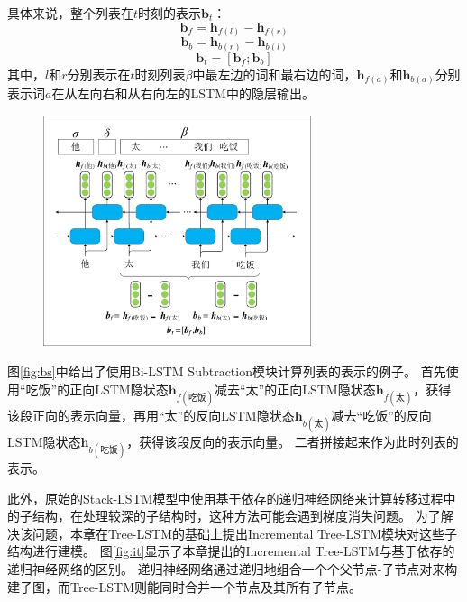 具体来说，整个列表在$t$时刻的表示$\bm{b}_t$：
\begin{equation}
	\bm{b}_f=\bm{h}_{f(l)}-\bm{h}_{f(r)}
\end{equation}
\begin{equation}
	\bm{b}_b=\bm{h}_{b(r)}-\bm{h}_{b(l)}
\end{equation}
\begin{equation}
	\bm{b}_t=[\bm{b}_f ; \bm{b}_b]
\end{equation}
其中，$l$和$r$分别表示在$t$时刻列表$\beta$中最左边的词和最右边的词，$\bm{h}_{f(a)}$和$\bm{h}_{b(a)}$分别表示词$a$在从左向右和从右向左的LSTM中的隐层输出。

\begin{figure}[hbtp]
	\centering
	\includegraphics[width=0.7\textwidth]{figures/bs.pdf}
\end{figure}

图\ref{fig:bs}中给出了使用Bi-LSTM Subtraction模块计算列表的表示的例子。
首先使用“吃饭”的正向LSTM隐状态$\bm{h}_{f(\text{吃饭})}$减去“太”的正向LSTM隐状态$\bm{h}_{f(\text{太})}$，获得该段正向的表示向量，再用“太”的反向LSTM隐状态$\bm{h}_{b(\text{太})}$减去“吃饭”的反向LSTM隐状态$\bm{h}_{b(\text{吃饭})}$，获得该段反向的表示向量。
二者拼接起来作为此时列表的表示。

此外，原始的Stack-LSTM模型中使用基于依存的递归神经网络来计算转移过程中的子结构，在处理较深的子结构时，这种方法可能会遇到梯度消失问题。
为了解决该问题，本章在Tree-LSTM的基础上提出Incremental Tree-LSTM模块对这些子结构进行建模。
图\ref{fig:it}显示了本章提出的Incremental Tree-LSTM与基于依存的递归神经网络的区别。
递归神经网络通过递归地组合一个个父节点-子节点对来构建子图，而Tree-LSTM则能同时合并一个节点及其所有子节点。

